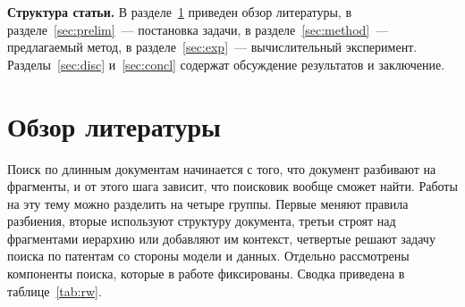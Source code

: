 \documentclass{article}
\begin{document}
\textbf{Структура статьи.} В разделе~\ref{sec:rw} приведен обзор литературы, в разделе~\ref{sec:prelim}~--- постановка задачи, в разделе~\ref{sec:method}~--- предлагаемый метод, в разделе~\ref{sec:exp}~--- вычислительный эксперимент. Разделы~\ref{sec:disc} и~\ref{sec:concl} содержат обсуждение результатов и заключение.

\section{Обзор литературы}\label{sec:rw}

Поиск по длинным документам начинается с того, что документ разбивают на фрагменты, и от этого шага зависит, что поисковик вообще сможет найти. Работы на эту тему можно разделить на четыре группы. Первые меняют правила разбиения, вторые используют структуру документа, третьи строят над фрагментами иерархию или добавляют им контекст, четвертые решают задачу поиска по патентам со стороны модели и данных. Отдельно рассмотрены компоненты поиска, которые в работе фиксированы. Сводка приведена в таблице~\ref{tab:rw}.
\end{document}
